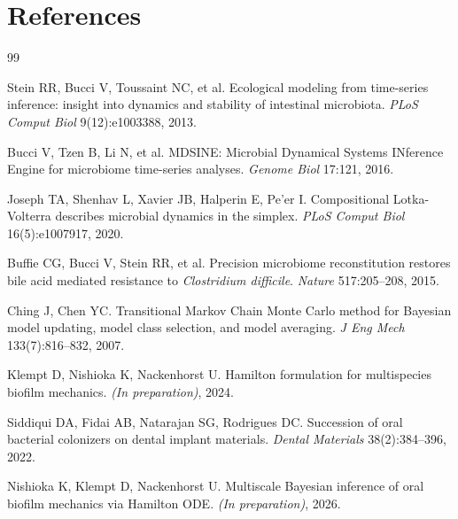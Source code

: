 \documentclass[10pt,a4paper]{article}
\begin{document}
\section*{References}

\begin{thebibliography}{99}

Stein RR, Bucci V, Toussaint NC, et al.
Ecological modeling from time-series inference: insight into dynamics
and stability of intestinal microbiota.
\textit{PLoS Comput Biol} 9(12):e1003388, 2013.

Bucci V, Tzen B, Li N, et al.
MDSINE: Microbial Dynamical Systems INference Engine for microbiome
time-series analyses.
\textit{Genome Biol} 17:121, 2016.

Joseph TA, Shenhav L, Xavier JB, Halperin E, Pe'er I.
Compositional Lotka-Volterra describes microbial dynamics in the simplex.
\textit{PLoS Comput Biol} 16(5):e1007917, 2020.

Buffie CG, Bucci V, Stein RR, et al.
Precision microbiome reconstitution restores bile acid mediated resistance
to \textit{Clostridium difficile}.
\textit{Nature} 517:205--208, 2015.

Ching J, Chen YC.
Transitional Markov Chain Monte Carlo method for Bayesian model updating,
model class selection, and model averaging.
\textit{J Eng Mech} 133(7):816--832, 2007.

Klempt D, Nishioka K, Nackenhorst U.
Hamilton formulation for multispecies biofilm mechanics.
\textit{(In preparation)}, 2024.

Siddiqui DA, Fidai AB, Natarajan SG, Rodrigues DC.
Succession of oral bacterial colonizers on dental implant materials.
\textit{Dental Materials} 38(2):384--396, 2022.

Nishioka K, Klempt D, Nackenhorst U.
Multiscale Bayesian inference of oral biofilm mechanics via Hamilton ODE.
\textit{(In preparation)}, 2026.

\end{thebibliography}
\end{document}

